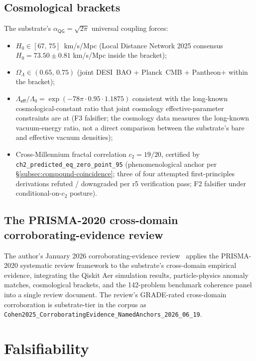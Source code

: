 \documentclass[11pt,a4paper]{amsart}
\theoremstyle{plain}
\theoremstyle{definition}
\begin{document}
\subsection{Cosmological brackets}

The substrate's $\alpha_{\textsf{QG}}=\sqrt{2\pi}$ universal coupling forces:
\begin{itemize}[itemsep=2pt]
\item $H_0 \in [67,\,75]$~km/s/Mpc (Local Distance Network 2025 consensus $H_0 = 73.50\pm 0.81$ km/s/Mpc inside the bracket);
\item $\Omega_\Lambda \in (0.65,\,0.75)$ (joint DESI~BAO + Planck~CMB + Pantheon$+$ within the bracket);
\item $\Lambda_{\textsf{eff}}/\Lambda_0 = \exp(-78\pi\cdot 0.95\cdot 1.1875)$ consistent with the long-known cosmological-constant ratio that joint cosmology effective-parameter constraints are at (F3 falsifier; the cosmology data measures the long-known vacuum-energy ratio, not a direct comparison between the substrate's bare and effective vacuum densities);
\item Cross-Millennium fractal correlation $c_2 = 19/20$, certified by \texttt{ch2\_predicted\_eq\_zero\_point\_95} (phenomenological anchor per \S\ref{subsec:compound-coincidence}; three of four attempted first-principles derivations refuted / downgraded per r5 verification pass; F2 falsifier under conditional-on-$c_2$ posture).
\end{itemize}

\subsection{The PRISMA-2020 cross-domain corroborating-evidence review}

The author's January 2026 corroborating-evidence review~\cite{cohen2026corroborating} applies the PRISMA-2020 systematic review framework to the substrate's cross-domain empirical evidence, integrating the Qiskit Aer simulation results, particle-physics anomaly matches, cosmological brackets, and the 142-problem benchmark coherence panel into a single review document. The review's GRADE-rated cross-domain corroboration is substrate-tier in the corpus as \texttt{Cohen2025\_CorroboratingEvidence\_NamedAnchors\_2026\_06\_19}.

\section{Falsifiability}\label{sec:falsifiers}
\end{document}
